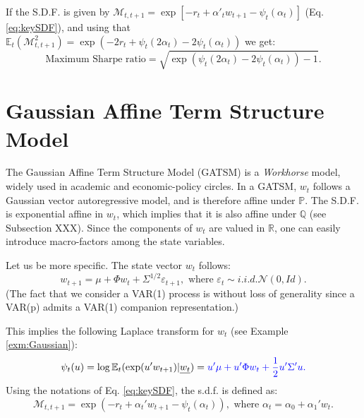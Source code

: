 \documentclass[
  12pt,
]{book}
\theoremstyle{definition}
\theoremstyle{definition}
\theoremstyle{definition}
\theoremstyle{definition}
\theoremstyle{remark}
\begin{document}
If the S.D.F. is given by \(\mathcal{M}_{t,t+1} = \exp[-r_{t}+\alpha'_tw_{t+1}-\psi_t(\alpha_t)]\) (Eq. \eqref{eq:keySDF}), and using that \(\mathbb{E}_t(\mathcal{M}_{t,t+1}^2)=\exp(-2r_t+\psi_t(2\alpha_t)-2\psi_t(\alpha_t))\) we get:
\[
\mbox{Maximum Sharpe ratio} = \sqrt{\exp(\psi_t(2\alpha_t)-2\psi_t(\alpha_t)) - 1}.
\]

\hypertarget{RiskFreeGaussian}{%
\section{Gaussian Affine Term Structure Model}\label{RiskFreeGaussian}}

The Gaussian Affine Term Structure Model (GATSM) is a \emph{Workhorse} model, widely used in academic and economic-policy circles. In a GATSM, \(w_t\) follows a Gaussian vector autoregressive model, and is therefore affine under \(\mathbb{P}\). The S.D.F. is exponential affine in \(w_t\), which implies that it is also affine under \(\mathbb{Q}\) (see Subsection XXX). Since the components of \(w_t\) are valued in \(\mathbb{R}\), one can easily introduce macro-factors among the state variables.

Let us be more specific. The state vector \(w_t\) follows:
\begin{equation}
w_{t+1} = \mu + \Phi w_{t} + \Sigma^{1/2} \varepsilon_{t+1}, \mbox{ where } \varepsilon_{t} \sim  i.i.d. \mathcal{N}(0,Id).\label{eq:GaussianVAR1}
\end{equation}
(The fact that we consider a VAR(1) process is without loss of generality since a VAR(p) admits a VAR(1) companion representation.)

This implies the following Laplace transform for \(w_t\) (see Example \ref{exm:Gaussian}):
\[
\psi_t(u) = \log \mathbb{E}_t(\exp(u'w_{t+1})|\underline{w_t}) = \color{blue}{u'\mu + u'\Phi w_t + \frac{1}{2}u'\Sigma'u}.
\]
Using the notations of Eq. \eqref{eq:keySDF}, the s.d.f. is defined as:
\[
\mathcal{M}_{t,t+1} = \exp(- r_t + \alpha_t'w_{t+1} - \psi_t(\alpha_t)), \mbox{ where } \alpha_t = \alpha_0 + \alpha_1'w_t.
\]
\end{document}
